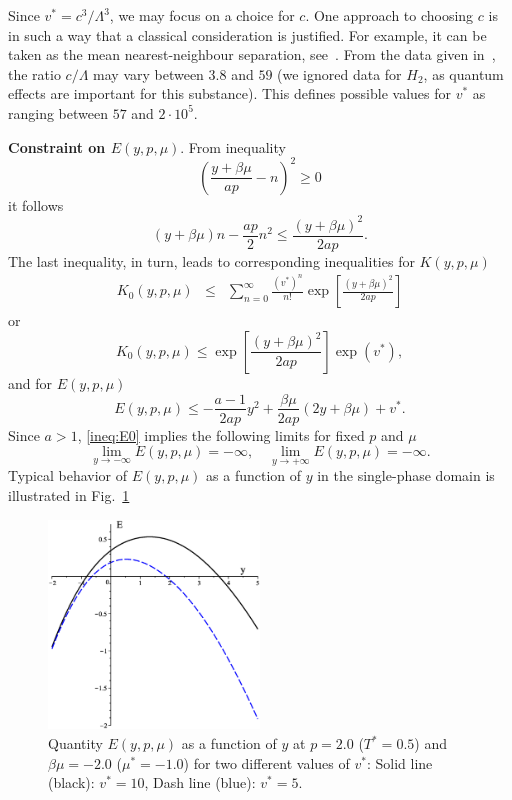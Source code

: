 \documentclass[12pt]{article}
\numberwithin{equation}{section}
\begin{document}
	Since $v^* = c^3/\Lambda^3$, we may focus on a choice for $c$. One approach to choosing $c$ is in such a way that a classical consideration is justified. For example, it can be taken as the mean nearest-neighbour separation, see~\cite[Sec.~1.1]{HansenMcDonald13}. From the data given in~\cite[Table~1.1]{HansenMcDonald13}, the ratio $c/\Lambda$ may vary between $3.8$ and $59$ (we ignored data for $H_2$, as quantum effects are important for this substance). This defines possible values for $v^*$ as ranging between $57$ and $2 \cdot 10^5$.
	
	\textbf{Constraint on $E(y,p,\mu)$}. From inequality
	\begin{equation}
		\left(\frac{y+\beta\mu}{ap} - n\right)^2 \geq 0
	\end{equation}
	it follows
	\begin{equation}
		(y+\beta\mu)n - \frac{ap}{2}n^2 \leq \frac{(y+\beta\mu)^2}{2ap}.
	\end{equation}
	The last inequality, in turn, leads to corresponding inequalities for $K(y,p,\mu)$
	\begin{eqnarray}
		K_0(y,p,\mu) & \leq & \sum_{n=0}^{\infty}\frac{(v^*)^n}{n!} \exp[\frac{(y+\beta\mu)^2}{2ap}]
	\end{eqnarray}
	or
	\begin{equation}
		K_0(y,p,\mu) \leq \exp[\frac{(y+\beta\mu)^2}{2ap}] \exp(v^*),
	\end{equation}
	and for $E(y,p,\mu)$
	\begin{equation}
		\label{ineq:E0}
		E(y,p,\mu) \leq -\frac{a-1}{2ap}y^2 + \frac{\beta\mu}{2ap}(2y+\beta\mu) + v^*.
	\end{equation}
	Since $a>1$, \eqref{ineq:E0} implies the following limits for fixed $p$ and $\mu$
	\begin{equation}
		\lim_{y \to -\infty} E(y,p,\mu) = -\infty, \quad \lim\limits_{y \to +\infty} E(y,p,\mu) = -\infty.
	\end{equation}
	Typical behavior of $E(y,p,\mu)$ as a function of $y$ in the single-phase domain is illustrated in Fig.~\ref{fig:E0_vs_y}
	\begin{figure}[htbp]
		\includegraphics[width=0.5\textwidth,angle=0]{E0_vs_y2}
		\centering
		\captionsetup{width=0.6\textwidth}
		\caption{Quantity $E(y,p,\mu)$ as a function of $y$ at $p=2.0$ ($T^*=0.5$) and $\beta\mu=-2.0$ ($\mu^*=-1.0$) for two different values of $v^*$: Solid line (black): $v^* = 10$, Dash line (blue): $v^* = 5$.}
		\label{fig:E0_vs_y}
	\end{figure}
	
\end{document}
